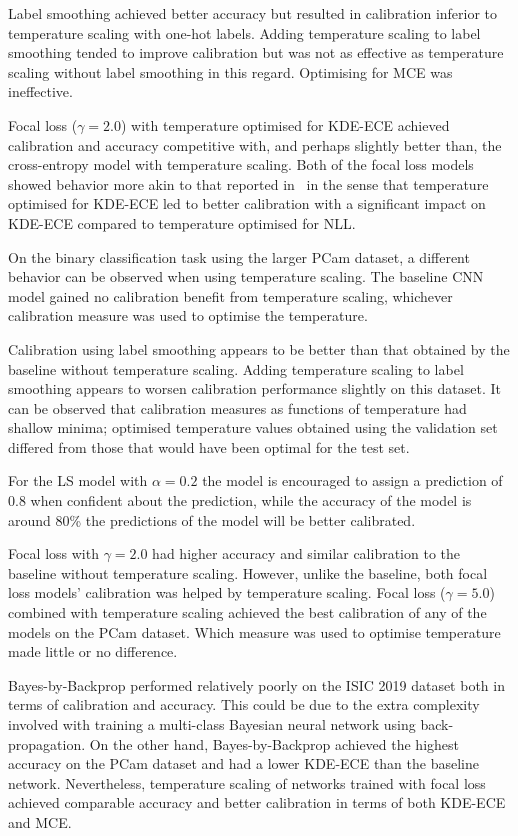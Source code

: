 Label smoothing achieved better accuracy but resulted in calibration inferior to temperature scaling with one-hot labels. Adding temperature scaling to label smoothing tended to improve calibration but was not as effective as temperature scaling without label smoothing in this regard. Optimising for MCE was ineffective. 

Focal loss ($\gamma = 2.0$) with temperature optimised for KDE-ECE achieved calibration and accuracy competitive with, and perhaps slightly better than, the cross-entropy model with temperature scaling. Both of the focal loss models showed behavior more akin to that reported in~\cite{mukhoti2020calibrating} in the sense that temperature optimised for KDE-ECE led to better calibration with a significant impact on KDE-ECE compared to temperature optimised for NLL.

On the binary classification task using the larger PCam dataset, a different behavior can be observed when using temperature scaling. The baseline CNN model gained no calibration benefit from temperature scaling, whichever calibration measure was used to optimise the temperature. 

Calibration using label smoothing appears to be better than that obtained by the baseline without temperature scaling. Adding temperature scaling to label smoothing appears to worsen calibration performance slightly on this dataset. It can be observed that calibration measures as functions of temperature had shallow minima; optimised temperature values obtained using the validation set differed from those that would have been optimal for the test set. 

For the LS model with $\alpha=0.2$ the model is encouraged to assign a prediction of 0.8 when confident about the prediction, while the accuracy of the model is around 80\% the predictions of the model will be better calibrated. 

Focal loss with $\gamma = 2.0$ had higher accuracy and similar calibration to the baseline without temperature scaling. However, unlike the baseline, both focal loss models' calibration was helped by temperature scaling. Focal loss ($\gamma = 5.0$) combined with temperature scaling achieved the best calibration of any of the models on the PCam dataset. Which measure was used to optimise temperature made little or no difference.

Bayes-by-Backprop performed relatively poorly on the ISIC 2019 dataset both in terms of calibration and accuracy. This could be due to the extra complexity involved with training a multi-class Bayesian neural network using back-propagation. On the other hand, Bayes-by-Backprop achieved the highest accuracy on the PCam dataset and had a lower KDE-ECE than the baseline network. Nevertheless, temperature scaling of networks trained with focal loss achieved comparable accuracy and better calibration in terms of both KDE-ECE and MCE. 


